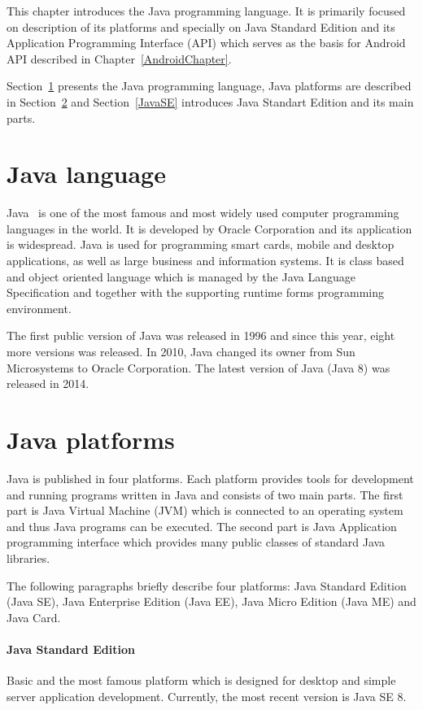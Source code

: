 This chapter introduces the Java programming language. It is primarily focused on description of its platforms and
specially on Java Standard Edition and its Application Programming Interface (API) which serves as the basis for Android
API described in Chapter~\ref{AndroidChapter}.

Section~\ref{JavaLang} presents the Java programming language, Java platforms are described in
Section~\ref{JavaPlatforms} and Section~\ref{JavaSE} introduces Java Standart Edition and its main parts.

\section{Java language}\label{JavaLang}
Java~\cite{JavaBook, Java6Doc} is one of the most famous and most widely used computer programming languages in the
world. It is developed by Oracle Corporation and its application is widespread. Java is used for programming smart
cards, mobile and desktop applications, as well as large business and information systems. It is class based and object
oriented language which is managed by the Java Language Specification and together with the supporting runtime forms
programming environment.

The first public version of Java was released in 1996 and since this year, eight more versions was released. In 2010,
Java changed its owner from Sun Microsystems to Oracle Corporation. The latest version of Java (Java 8) was released in
2014.

\section{Java platforms}\label{JavaPlatforms}
Java is published in four platforms. Each platform provides tools for development and running programs written in Java
and consists of two main parts. The first part is Java Virtual Machine (JVM) which is connected to an operating system
and thus Java programs can be executed. The second part is Java Application programming interface which provides many
public classes of standard Java libraries.

The following paragraphs briefly describe four platforms: Java Standard Edition (Java SE), Java Enterprise Edition
(Java EE), Java Micro Edition (Java ME) and Java Card.

\paragraph{Java Standard Edition}
Basic and the most famous platform which is designed for desktop and simple server application development. Currently,
the most recent version is Java SE 8.

